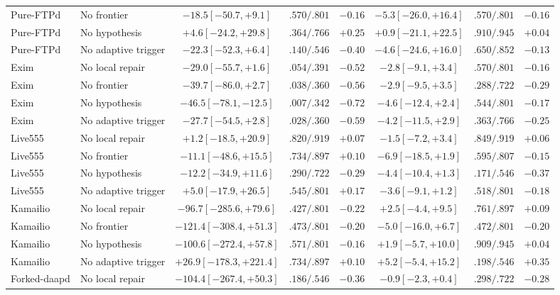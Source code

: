 \documentclass[final,5p,times,number]{elsarticle}
\begin{document}
\begin{table}[!t]
{{\begin{tabular}{l l c c c c c c}
Pure-FTPd & No frontier & $-18.5 [-50.7,+9.1]$ & $.570/.801$ & $-0.16$ & $-5.3 [-26.0,+16.4]$ & $.570/.801$ & $-0.16$ \\
Pure-FTPd & No hypothesis & $+4.6 [-24.2,+29.8]$ & $.364/.766$ & $+0.25$ & $+0.9 [-21.1,+22.5]$ & $.910/.945$ & $+0.04$ \\
Pure-FTPd & No adaptive trigger & $-22.3 [-52.3,+6.4]$ & $.140/.546$ & $-0.40$ & $-4.6 [-24.6,+16.0]$ & $.650/.852$ & $-0.13$ \\
Exim & No local repair & $-29.0 [-55.7,+1.6]$ & $.054/.391$ & $-0.52$ & $-2.8 [-9.1,+3.4]$ & $.570/.801$ & $-0.16$ \\
Exim & No frontier & $-39.7 [-86.0,+2.7]$ & $.038/.360$ & $-0.56$ & $-2.9 [-9.5,+3.5]$ & $.288/.722$ & $-0.29$ \\
Exim & No hypothesis & $-46.5 [-78.1,-12.5]$ & $.007/.342$ & $-0.72$ & $-4.6 [-12.4,+2.4]$ & $.544/.801$ & $-0.17$ \\
Exim & No adaptive trigger & $-27.7 [-54.5,+2.8]$ & $.028/.360$ & $-0.59$ & $-4.2 [-11.5,+2.9]$ & $.363/.766$ & $-0.25$ \\
Live555 & No local repair & $+1.2 [-18.5,+20.9]$ & $.820/.919$ & $+0.07$ & $-1.5 [-7.2,+3.4]$ & $.849/.919$ & $+0.06$ \\
Live555 & No frontier & $-11.1 [-48.6,+15.5]$ & $.734/.897$ & $+0.10$ & $-6.9 [-18.5,+1.9]$ & $.595/.807$ & $-0.15$ \\
Live555 & No hypothesis & $-12.2 [-34.9,+11.6]$ & $.290/.722$ & $-0.29$ & $-4.4 [-10.4,+1.3]$ & $.171/.546$ & $-0.37$ \\
Live555 & No adaptive trigger & $+5.0 [-17.9,+26.5]$ & $.545/.801$ & $+0.17$ & $-3.6 [-9.1,+1.2]$ & $.518/.801$ & $-0.18$ \\
Kamailio & No local repair & $-96.7 [-285.6,+79.6]$ & $.427/.801$ & $-0.22$ & $+2.5 [-4.4,+9.5]$ & $.761/.897$ & $+0.09$ \\
Kamailio & No frontier & $-121.4 [-308.4,+51.3]$ & $.473/.801$ & $-0.20$ & $-5.0 [-16.0,+6.7]$ & $.472/.801$ & $-0.20$ \\
Kamailio & No hypothesis & $-100.6 [-272.4,+57.8]$ & $.571/.801$ & $-0.16$ & $+1.9 [-5.7,+10.0]$ & $.909/.945$ & $+0.04$ \\
Kamailio & No adaptive trigger & $+26.9 [-178.3,+221.4]$ & $.734/.897$ & $+0.10$ & $+5.2 [-5.4,+15.2]$ & $.198/.546$ & $+0.35$ \\
Forked-daapd & No local repair & $-104.4 [-267.4,+50.3]$ & $.186/.546$ & $-0.36$ & $-0.9 [-2.3,+0.4]$ & $.298/.722$ & $-0.28$ \\

\end{tabular}}}
\end{table}
\end{document}
